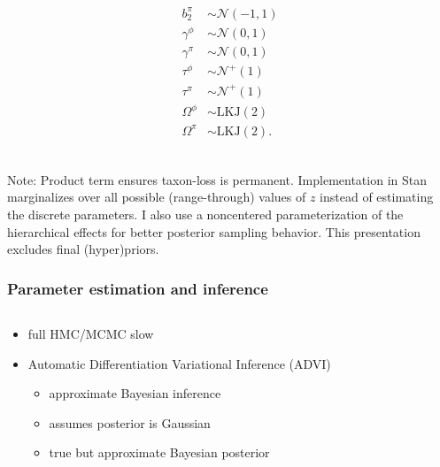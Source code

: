 \documentclass{beamer}
\begin{document}
\begin{frame}
\begin{footnotesize}
\begin{columns}
\begin{column}{0.5\textwidth}
\begin{align*}
          b^{\pi}_{2} &\sim \mathcal{N}(-1, 1) \\
          \gamma^{\phi} &\sim \mathcal{N}(0, 1) \\
          \gamma^{\pi} &\sim \mathcal{N}(0, 1) \\
          \tau^{\phi} &\sim \mathcal{N}^{+}(1) \\
          \tau^{\pi} &\sim \mathcal{N}^{+}(1) \\
          \Omega^{\phi} &\sim \text{LKJ}(2) \\
          \Omega^{\pi} &\sim \text{LKJ}(2). \\
        \end{align*}
      \end{column}
    \end{columns}
  \end{footnotesize} 


  \scriptsize{Note: Product term ensures taxon-loss is permanent. Implementation in Stan marginalizes over all possible (range-through) values of \(z\) instead of estimating the discrete parameters. I also use a noncentered parameterization of the hierarchical effects for better posterior sampling behavior. This presentation excludes final (hyper)priors.}
\end{frame}


\begin{frame}
  \frametitle{Parameter estimation and inference}

  \begin{columns}
    \begin{column}{0.45\textwidth}
      \begin{itemize}
        \item full HMC/MCMC slow
        \item Automatic Differentiation Variational Inference (ADVI) 
          \begin{itemize}
            \item approximate Bayesian inference
            \item assumes posterior is Gaussian
            \item true but approximate Bayesian posterior
          \end{itemize}
      \end{itemize}
    \end{column}
    \begin{column}{0.55\textwidth}
    \end{column}
  \end{columns}
\end{frame}
\end{document}
